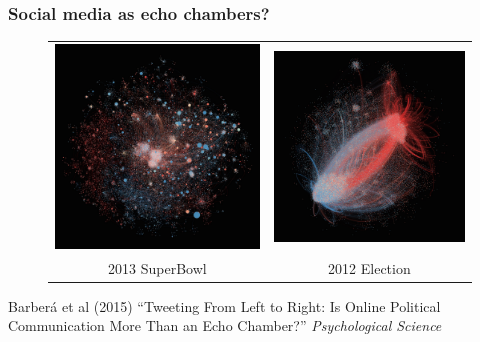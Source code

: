 \documentclass{beamer}
\begin{document}
\setlength{\leftmargini}{6pt}
\begin{frame}
	\frametitle{Social media as echo chambers?}
	
	\begin{figure}
		\begin{tabular}{cc}
			\hspace{-.5cm}\includegraphics[width=.45\textwidth]{figures/figure3b.jpg} & \includegraphics[width=.45\textwidth]{figures/figure3a.jpg}\\
			\small{2013 SuperBowl}  & \small{2012 Election} \\
		\end{tabular}
	\end{figure}
	
	\vspace{.10cm}
	\vfill
	\footnotesize{Barber\'{a} et al (2015) ``Tweeting From Left to Right: Is Online Political Communication More Than an Echo Chamber?'' \textit{Psychological Science}}
\end{frame}
\setlength{\leftmargini}{12pt}
\end{document}
